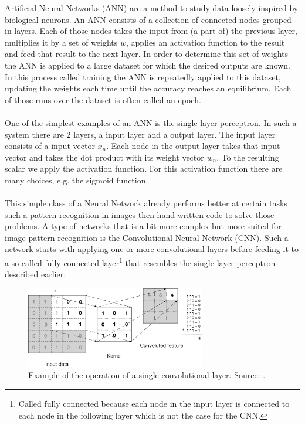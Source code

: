 \documentclass[10 pt, a4paper]{article}
\begin{document}
Artificial Neural Networks (ANN) are a method to study data loosely inspired by biological neurons. An ANN consists of a collection of connected nodes grouped in layers. Each of those nodes takes the input from (a part of) the previous layer, multiplies it by a set of weights $w$, applies an activation function to the result and feed that result to the next layer. In order to determine this set of weights the ANN is applied to a large dataset for which the desired outputs are known. In this process called training the ANN is repeatedly applied to this dataset, updating the weights each time until the accuracy reaches an equilibrium. Each of those runs over the dataset is often called an epoch.
\\
\\
One of the simplest examples of an ANN is the single-layer perceptron. In such a system there are 2 layers, a input layer and a output layer. The input layer consists of a input vector $x_n$. Each node in the output layer takes that input vector and takes the dot product with its weight vector $w_n$. To the resulting scalar we apply the activation function. For this activation function there are many choices, e.g. the sigmoid function. 
\\
\\
This simple class of a Neural Network already performs better at certain tasks such a pattern recognition in images then hand written code to solve those problems. A type of networks that is a bit more complex but more suited for image pattern recognition is the Convolutional Neural Network (CNN). Such a network starts with applying one or more convolutional layers before feeding it to a so called fully connected layer\footnote{Called fully connected because each node in the input layer is connected to each node in the following layer which is not the case for the CNN.} that resembles the single layer perceptron  described earlier.

\begin{figure}[H]
\centering
\includegraphics[width=0.7\textwidth]{CNNop}
\caption{Example of the operation of a single convolutional layer. Source: \cite{deep}. \label{fig:CNNop}}
\end{figure}
\end{document}
